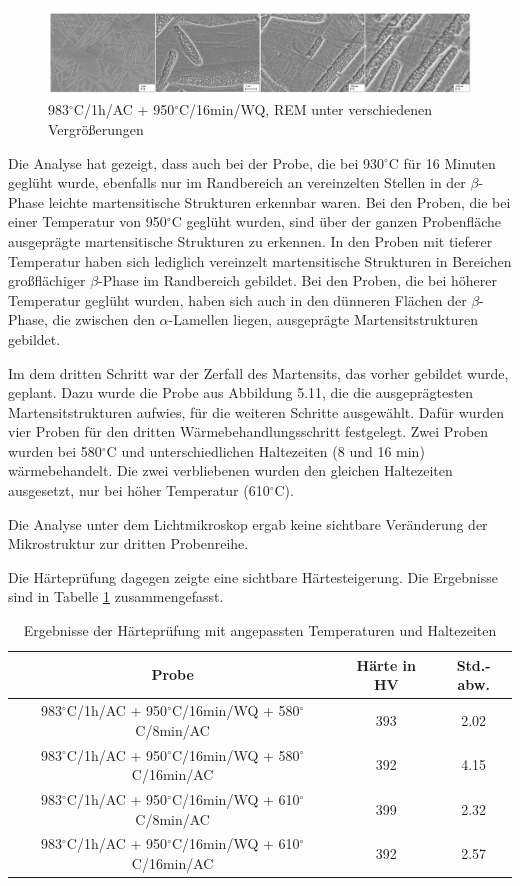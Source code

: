 \begin{figure}[!]
	\centering
	\includegraphics[width=0.9\linewidth]{./Bilder/Abbildung 18}
	\caption[Abbildung 18]{983$^\circ$C/1h/AC + 950$^\circ$C/16min/WQ, REM unter verschiedenen Vergrößerungen}
	\label{fig:abbildung-18}
\end{figure}

Die Analyse hat gezeigt, dass auch bei der Probe, die bei 930$^\circ$C für 16 Minuten geglüht wurde, ebenfalls nur im Randbereich an vereinzelten Stellen in der $\beta$-Phase leichte martensitische Strukturen erkennbar waren.
Bei den Proben, die bei einer Temperatur von 950$^\circ$C geglüht wurden, sind über der ganzen Probenfläche ausgeprägte martensitische Strukturen zu erkennen. In den Proben mit tieferer Temperatur haben sich lediglich vereinzelt martensitische Strukturen in Bereichen großflächiger $\beta$-Phase im Randbereich gebildet. Bei den Proben, die bei höherer Temperatur geglüht wurden, haben sich auch in den dünneren Flächen der $\beta$-Phase, die zwischen den $\alpha$-Lamellen liegen, ausgeprägte Martensitstrukturen gebildet.

Im dem dritten Schritt war der Zerfall des Martensits, das vorher gebildet wurde, geplant. Dazu wurde die Probe aus Abbildung 5.11, die die ausgeprägtesten Martensitstrukturen aufwies, für die weiteren Schritte ausgewählt. 
Dafür wurden vier Proben für den dritten Wärmebehandlungsschritt festgelegt. Zwei Proben wurden bei 580$^\circ$C und unterschiedlichen Haltezeiten (8 und 16 min) wärmebehandelt. Die zwei verbliebenen wurden den gleichen Haltezeiten ausgesetzt, nur bei höher Temperatur (610$^\circ$C).

Die Analyse unter dem Lichtmikroskop ergab keine sichtbare Veränderung der Mikrostruktur zur dritten Probenreihe.

Die Härteprüfung dagegen zeigte eine sichtbare Härtesteigerung. Die Ergebnisse sind in Tabelle \ref{Tabelle 8} zusammengefasst.

\begin{table}[h]
	\centering
	\begin{tabular}{|c|c|c|}
		\hline 
		Probe & Härte in HV &  Std.-abw. \\ 
		\hline 
		983$^\circ$C/1h/AC + 950$^\circ$C/16min/WQ + 580$^\circ$C/8min/AC & 393 & 2.02 \\ 
		\hline 
		983$^\circ$C/1h/AC + 950$^\circ$C/16min/WQ + 580$^\circ$C/16min/AC & 392 & 4.15 \\ 
		\hline 
		983$^\circ$C/1h/AC + 950$^\circ$C/16min/WQ + 610$^\circ$C/8min/AC & 399 & 2.32 \\ 
		\hline 
		983$^\circ$C/1h/AC + 950$^\circ$C/16min/WQ + 610$^\circ$C/16min/AC & 392 & 2.57 \\ 
		\hline 
	\end{tabular} 
	\caption{Ergebnisse der Härteprüfung mit angepassten Temperaturen und Haltezeiten}
	\label{Tabelle 8}
\end{table}

